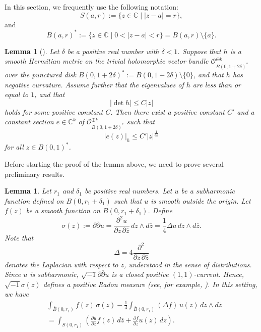 \documentclass[12pt,twoside]{amsart}
\newtheorem{lem}[thm]{Lemma}
\theoremstyle{definition}
\begin{document}
In this section, we frequently use the following notation:
\[
S(a, r) := \{ z \in \mathbb{C} \mid |z - a| = r \},
\]
and 
\[
B(a, r)^* := \{ z \in \mathbb{C} \mid 0 < |z - a| <r \} = B(a, r) \setminus \{a\}.
\]

\begin{lem}[{\cite[Lemma 10.2]{simpson1}}]\label{q-lem10.1}
Let $\delta$ be a positive real number with $\delta < 1$.  
Suppose that $h$ is a smooth Hermitian metric on the trivial holomorphic vector bundle  
$\mathcal{O}_{B(0,1+2\delta)^*}^{\oplus k}$  
over the punctured disk  
$B(0,1+2\delta)^* := B(0,1+2\delta) \setminus \{0\}$,  
and that $h$ has negative curvature.  
Assume further that the eigenvalues of $h$ are less than or 
equal to $1$, and that  
\[
|\det h| \leq C |z|
\]  
holds for some positive constant $C$.  
Then there exist a positive constant $C'$ and a constant section 
$e \in \mathbb{C}^k$ of $\mathcal O^{\oplus k}_{B(0, 1+2\delta)^*}$ 
such that  
\[
|e(z)|_h \leq C' |z|^{\frac{1}{3k}}
\]  
for all $z \in B(0,1)^*$.
\end{lem}

Before starting the proof of the lemma above,
we need to prove several preliminary results.

\begin{lem}\label{q-lem10.2} 
Let \( r_1 \) and \( \delta_1 \) be positive real numbers. 
Let \( u \) be a subharmonic function defined on \( B(0, r_1 + \delta_1) \) 
such that \( u \) is smooth outside the origin. 
Let \( f(z) \) be a smooth function on \( B(0, r_1 + \delta_1) \). 
Define
\[
\sigma(z) := \partial \overline{\partial} u 
= \frac{\partial^2 u}{\partial z \, \partial \overline{z}} \, dz \wedge d\overline{z} 
= \frac{1}{4} \Delta u \, dz \wedge d\overline{z}.
\]
Note that
\[
\Delta = 4 \frac{\partial^2 }{\partial z \, \partial \overline{z}}
\]
denotes the Laplacian with respect to \( z \), understood in the sense of distributions. 
Since \( u \) is subharmonic, \( \sqrt{-1} \partial \overline{\partial} u \) 
is a closed positive \((1,1)\)-current. Hence, \( \sqrt{-1} \sigma(z) \) defines 
a positive Radon measure {\em{(}}see, for example, 
\cite[(3.1.14) Lemma]{noguchi-ochiai}{\em{)}}. In this setting, we have
\begin{equation}\label{q-eq10.1} 
\begin{split}
&\int_{\overline{B}(0, r_1)} f(z) \, \sigma(z) 
- \frac{1}{4} \int_{\overline{B}(0, r_1)} (\Delta f) \, u(z) \, dz \wedge d\overline{z} 
\\&
= \int_{S(0, r_1)} \left( \frac{\partial u}{\partial \overline{z}} f(z) \, d\overline{z} 
+ \frac{\partial f}{\partial z} u(z) \, dz \right).
\end{split}
\end{equation}
\end{lem}
\end{document}
